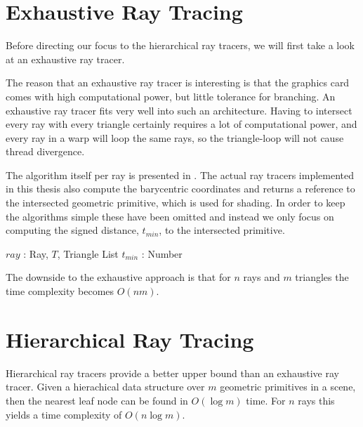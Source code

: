 \section{Exhaustive Ray Tracing}

Before directing our focus to the hierarchical ray tracers, we will
first take a look at an exhaustive ray tracer.


The reason that an exhaustive ray tracer is interesting is that the
graphics card comes with high computational power, but little
tolerance for branching. An exhaustive ray tracer fits very well into
such an architecture. Having to intersect every ray with every
triangle certainly requires a lot of computational power, and every
ray in a warp will loop the same rays, so the triangle-loop will not
cause thread divergence.


The algorithm itself per ray is presented in
. The actual ray tracers implemented in this
thesis also compute the barycentric coordinates and returns a
reference to the intersected geometric primitive, which is used for
shading. In order to keep the algorithms simple these have been
omitted and instead we only focus on computing the signed distance,
$t_{min}$, to the intersected primitive.

\begin{algorithm}
  \caption{Exhaustive ray tracer}
  \label{alg:exhaustive}
  \begin{algorithmic}
              {$ray$ : Ray, $T$, Triangle List}
              {$t_{min}$ : Number}{
                \ENDFOR
              }
  \end{algorithmic}
\end{algorithm}

The downside to the exhaustive approach is that for $n$ rays and $m$
triangles the time complexity becomes $O(nm)$.

\section{Hierarchical Ray Tracing}


Hierarchical ray tracers provide a better upper bound than an
exhaustive ray tracer. Given a hierachical data structure over $m$
geometric primitives in a scene, then the nearest leaf node can be
found in $O(\log m)$ time. For $n$ rays this yields a time complexity
of $O(n \log m)$.

